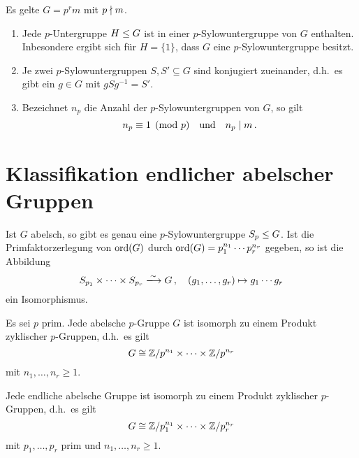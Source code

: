 \begin{theorem}[Sylowsätze]
  Es gelte $G = p^r m$ mit $p \mathrel{\nmid} m$.
  \begin{enumerate}
    \item
      Jede $p$-Untergruppe $H \mathrel{\leq} G$ ist in einer $p$-Sylowuntergruppe von $G$ enthalten.
      Inbesondere ergibt sich für $H = \{1\}$, dass $G$ eine $p$-Sylowuntergruppe besitzt.
    \item
      Je zwei $p$-Sylowuntergruppen $S, S' \subseteq G$ sind konjugiert zueinander, d.h.\ es gibt ein $g \in G$ mit $g S g^{-1} = S'$.
    \item
      Bezeichnet $n_p$ die Anzahl der $p$-Sylowuntergruppen von $G$, so gilt
      \[
                n_p
        \equiv  1
        \pmod{p}
        \quad\text{und}\quad
        n_p \mathrel{|} m \,.
      \]

  \end{enumerate}
\end{theorem}



\section{Klassifikation endlicher abelscher Gruppen}

\begin{theorem}
  Ist $G$ abelsch, so gibt es genau eine $p$-Sylowuntergruppe $S_p \mathrel{\leq} G$.
  Ist die Primfaktorzerlegung von $\operatorname{ord}(G)$ durch $\operatorname{ord}(G) = p_1^{n_1} \dotsm p_r^{n_r}$ gegeben, so ist die Abbildung
  \[
                            S_{p_1} \times \dotsb \times S_{p_r}
    \xlongrightarrow{\sim}  G \,,
    \quad                   (g_1, \dotsc, g_r)
    \mapsto                 g_1 \dotsm g_r
  \]
  ein Isomorphismus.
\end{theorem}

\begin{proposition}
  Es sei $p$ prim.
  Jede abelsche $p$-Gruppe $G$ ist isomorph zu einem Produkt zyklischer $p$-Gruppen, d.h.\ es gilt
  \[
          G
    \cong \mathbb{Z}/p^{n_1} \times \dotsm \times \mathbb{Z}/p^{n_r}
  \]
  mit $n_1, \dotsc, n_r \geq 1$.
\end{proposition}

\begin{corollary}
  Jede endliche abelsche Gruppe ist isomorph zu einem Produkt zyklischer $p$-Gruppen, d.h.\ es gilt
  \[
          G
    \cong \mathbb{Z}/p_1^{n_1} \times \dotsm \times \mathbb{Z}/p_r^{n_r}
  \]
  mit $p_1, \dotsc, p_r$ prim und $n_1, \dotsc, n_r \geq 1$.
\end{corollary}

